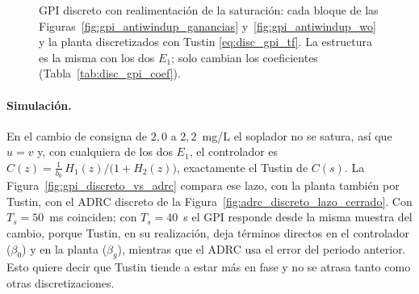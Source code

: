 \begin{figure}[H]
{%
  }
  \caption[GPI discreto con realimentación de la saturación]{GPI discreto con
    realimentación de la saturación: cada bloque de las
    Figuras~\ref{fig:gpi_antiwindup_ganancias} y~\ref{fig:gpi_antiwindup_wo} y la planta
    discretizados con Tustin \eqref{eq:disc_gpi_tf}. La estructura es la misma con los dos
    $E_1$; solo cambian los coeficientes (Tabla~\ref{tab:disc_gpi_coef}).}
  \label{fig:gpi_discreto}
\end{figure}
\paragraph{Simulación.} En el cambio de consigna de $2{,}0$ a $2{,}2$~mg/L el
soplador no se satura, así que $u = v$ y, con cualquiera de los dos $E_1$, el controlador es
$C(z) = \frac{1}{b_0}\,H_1(z)/\bigl(1 + H_2(z)\bigr)$, exactamente el Tustin de
$C(s)$. La Figura~\ref{fig:gpi_discreto_vs_adrc} compara ese lazo, con la
planta también por Tustin, con el ADRC discreto de la
Figura~\ref{fig:adrc_discreto_lazo_cerrado}. Con $T_s = 50$~ms coinciden; con
$T_s = 40$~s el GPI responde desde la misma muestra del cambio, porque Tustin, en su realización,
deja términos directos en el controlador ($\beta_0$) y en la planta ($\beta_g$), mientras que el
ADRC usa el error del periodo anterior. Esto quiere decir que Tustin tiende a estar más en fase y no
se atrasa tanto como otras discretizaciones.

